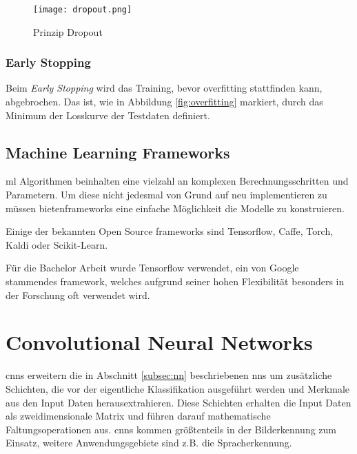 \begin{figure}[H]
    \centering
    \texttt{[image: dropout.png]}
    \caption{Prinzip Dropout \cite{maksutovDeepStudyNot2018}}
    \label{fig:dropout}
\end{figure}


\subsubsection{Early Stopping}
Beim \textit{Early Stopping} wird das Training, 
bevor \Gls{overfitting} stattfinden kann, abgebrochen.
Das ist, wie in Abbildung \ref{fig:overfitting}
markiert, durch das Minimum der Losskurve der Testdaten 
definiert.



\subsection{Machine Learning Frameworks}

\Gls{ml} Algorithmen beinhalten eine vielzahl an komplexen
Berechnungsschritten und Parametern. Um diese nicht jedesmal 
von Grund auf neu implementieren zu müssen 
bieten\Glspl{framework}
eine einfache Möglichkeit die Modelle zu konstruieren.

Einige der bekannten Open Source \Glspl{framework} sind
 Tensorflow, Caffe, Torch, Kaldi oder Scikit-Learn.

Für die Bachelor Arbeit wurde Tensorflow verwendet,
ein von Google stammendes \Gls{framework},
welches aufgrund seiner hohen Flexibilität besonders 
in der Forschung oft verwendet wird.



\section{Convolutional Neural Networks}\label{subsec:cnn}

\Glspl{cnn} erweitern die in Abschnitt \ref{subsec:nn} beschriebenen
\Glspl{nn} um zusätzliche Schichten,
die vor der eigentliche Klassifikation ausgeführt werden
und Merkmale aus den Input Daten herausextrahieren.
Diese Schichten erhalten die Input Daten als
zweidimensionale Matrix und führen darauf 
mathematische Faltungsoperationen aus.
\Glspl{cnn} kommen größtenteils in der Bilderkennung zum 
Einsatz, weitere Anwendungsgebiete sind 
z.B. die Spracherkennung.

